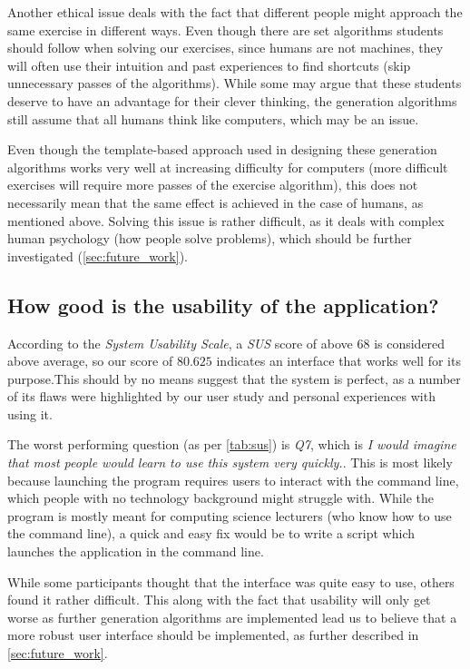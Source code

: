 \documentclass{l4proj}
\begin{document}
Another ethical issue deals with the fact that different people might approach the same exercise in different ways. Even though there are set algorithms students should follow when solving our exercises, since humans are not machines, they will often use their intuition and past experiences to find shortcuts (skip unnecessary passes of the algorithms). While some may argue that these students deserve to have an advantage for their clever thinking, the generation algorithms still assume that all humans think like computers, which may be an issue.

Even though the template-based approach used in designing these generation algorithms works very well at increasing difficulty for computers (more difficult exercises will require more passes of the exercise algorithm), this does not necessarily mean that the same effect is achieved in the case of humans, as mentioned above. Solving this issue is rather difficult, as it deals with complex human psychology (how people solve problems), which should be further investigated (\autoref{sec:future_work}).

\subsection*{How good is the usability of the application?}

According to the \emph{System Usability Scale}, a \emph{SUS} score of above $68$ is considered above average, so our score of $80.625$ indicates an interface that works well for its purpose.This should by no means suggest that the system is perfect, as a number of its flaws were highlighted by our user study and personal experiences with using it.

The worst performing question (as per \autoref{tab:sus}) is \emph{Q7}, which is \emph{I would imagine that most people would learn to use this system very quickly.}. This is most likely because launching the program requires users to interact with the command line, which people with no technology background might struggle with. While the program is mostly meant for computing science lecturers (who know how to use the command line), a quick and easy fix would be to write a script which launches the application in the command line.

While some participants thought that the interface was quite easy to use, others found it rather difficult. This along with the fact that usability will only get worse as further generation algorithms are implemented lead us to believe that a more robust user interface should be implemented, as further described in \autoref{sec:future_work}.
\end{document}
